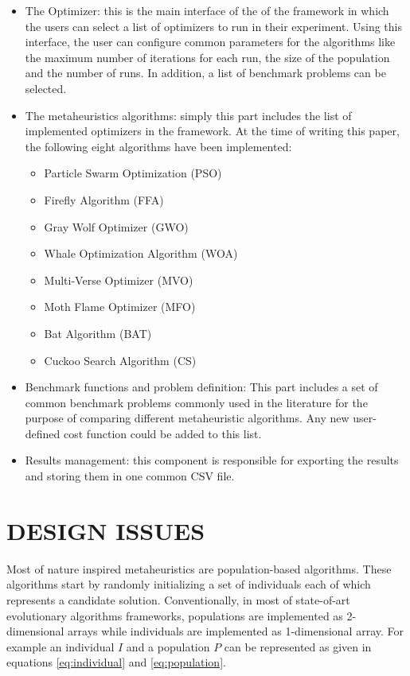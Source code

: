 \documentclass[a4paper,twoside]{article}
\begin{document}
\begin{itemize}
\item The Optimizer: this is the main interface of the of the framework in which the users can select a list of optimizers to run in their experiment. Using this interface, the user can configure common parameters for the algorithms like the maximum number of iterations for each run, the size of the population and the number of runs. In addition, a list of benchmark problems can be selected.

\item The metaheuristics algorithms: simply this part includes the list of implemented optimizers in the framework. At the time of writing this paper, the following eight algorithms have been implemented:

\begin{itemize}
\item Particle Swarm Optimization (PSO)
\item  Firefly Algorithm (FFA) \cite{Yang2010FFA} 
\item Gray Wolf Optimizer (GWO)\cite{Mirjalili201446}
\item Whale Optimization Algorithm (WOA) \cite{Mirjalili201651}
\item Multi-Verse Optimizer (MVO) \cite{Mirjalili2016}
\item Moth Flame Optimizer (MFO) \cite{Mirjalili2015228}
\item Bat Algorithm (BAT) \cite{Yang2010}
\item Cuckoo Search Algorithm (CS) \cite{Yang2009}
\end{itemize}



\item Benchmark functions and problem definition: This part includes a set of common benchmark problems commonly used in the literature for the purpose of comparing different metaheuristic algorithms. Any new user-defined cost function could be added to this list.

\item Results management: this component is responsible for exporting the results and storing them in one common CSV file. 
\end{itemize}


\section{\uppercase{Design issues}}

Most of nature inspired metaheuristics are population-based algorithms. These algorithms start by randomly initializing a set of individuals each of which represents a candidate solution. Conventionally, in most of state-of-art evolutionary algorithms frameworks, populations are implemented as 2-dimensional arrays while individuals are implemented as 1-dimensional array. For example an individual $I$ and a population $P$ can be represented as given in equations \ref{eq:individual} and \ref{eq:population}.
\end{document}

